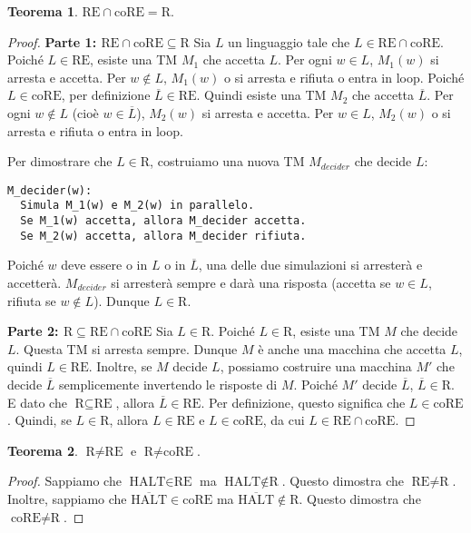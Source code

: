 \documentclass[a4paper]{article}
\theoremstyle{definition} %
\newtheorem{theorem}{Teorema}
\begin{document}
\begin{theorem}
$\text{RE} \cap \text{coRE} = \text{R}$.
\end{theorem}
\begin{proof}
\textbf{Parte 1: $\text{RE} \cap \text{coRE} \subseteq \text{R}$}
Sia $L$ un linguaggio tale che $L \in \text{RE} \cap \text{coRE}$.
Poiché $L \in \text{RE}$, esiste una TM $M_1$ che accetta $L$. Per ogni $w \in L$, $M_1(w)$ si arresta e accetta. Per $w \notin L$, $M_1(w)$ o si arresta e rifiuta o entra in loop.
Poiché $L \in \text{coRE}$, per definizione $\overline{L} \in \text{RE}$. Quindi esiste una TM $M_2$ che accetta $\overline{L}$. Per ogni $w \notin L$ (cioè $w \in \overline{L}$), $M_2(w)$ si arresta e accetta. Per $w \in L$, $M_2(w)$ o si arresta e rifiuta o entra in loop.

Per dimostrare che $L \in \text{R}$, costruiamo una nuova TM $M_{decider}$ che decide $L$:
\begin{verbatim}
M_decider(w):
  Simula M_1(w) e M_2(w) in parallelo.
  Se M_1(w) accetta, allora M_decider accetta.
  Se M_2(w) accetta, allora M_decider rifiuta.
\end{verbatim}
Poiché $w$ deve essere o in $L$ o in $\overline{L}$, una delle due simulazioni si arresterà e accetterà. $M_{decider}$ si arresterà sempre e darà una risposta (accetta se $w \in L$, rifiuta se $w \notin L$). Dunque $L \in \text{R}$.

\textbf{Parte 2: $\text{R} \subseteq \text{RE} \cap \text{coRE}$}
Sia $L \in \text{R}$.
Poiché $L \in \text{R}$, esiste una TM $M$ che decide $L$. Questa TM si arresta sempre. Dunque $M$ è anche una macchina che accetta $L$, quindi $L \in \text{RE}$.
Inoltre, se $M$ decide $L$, possiamo costruire una macchina $M'$ che decide $\overline{L}$ semplicemente invertendo le risposte di $M$. Poiché $M'$ decide $\overline{L}$, $\overline{L} \in \text{R}$. E dato che $\text{R} \subseteq \text{RE}$, allora $\overline{L} \in \text{RE}$. Per definizione, questo significa che $L \in \text{coRE}$.
Quindi, se $L \in \text{R}$, allora $L \in \text{RE}$ e $L \in \text{coRE}$, da cui $L \in \text{RE} \cap \text{coRE}$.
\end{proof}

\begin{theorem}
$\text{R} \neq \text{RE}$ e $\text{R} \neq \text{coRE}$.
\end{theorem}
\begin{proof}
Sappiamo che $\text{HALT} \in \text{RE}$ ma $\text{HALT} \notin \text{R}$. Questo dimostra che $\text{RE} \neq \text{R}$.
Inoltre, sappiamo che $\overline{\text{HALT}} \in \text{coRE}$ ma $\overline{\text{HALT}} \notin \text{R}$. Questo dimostra che $\text{coRE} \neq \text{R}$.
\end{proof}
\end{document}
